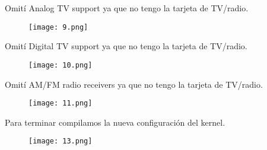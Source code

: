 \documentclass[11pt, a4paper]{report}
\begin{document}
    \newpage
    
    Omití Analog TV support ya que no tengo la tarjeta de TV/radio. \\

    \begin{figure}[!ht] 
      \begin{center}  
        \texttt{[image: 9.png]} 
        \caption{} 
      \end{center} 
    \end{figure}
        
    Omití Digital TV support ya que no tengo la tarjeta de TV/radio. \\

    \begin{figure}[!ht] 
      \begin{center}  
        \texttt{[image: 10.png]} 
        \caption{} 
      \end{center} 
    \end{figure}

    Omití AM/FM radio receivers ya que no tengo la tarjeta de TV/radio.\\
    
    \begin{figure}[!ht] 
      \begin{center}  
        \texttt{[image: 11.png]} 
        \caption{} 
      \end{center} 
    \end{figure}    

    Para terminar compilamos la nueva configuración del kernel. \\

    \begin{figure}[!ht] 
      \begin{center}  
        \texttt{[image: 13.png]} 
        \caption{} 
      \end{center} 
    \end{figure}    
    
\end{document}
